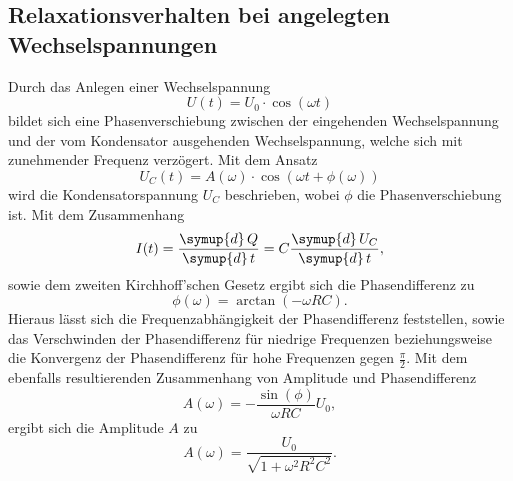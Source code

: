 \subsection{Relaxationsverhalten bei angelegten Wechselspannungen}
    Durch das Anlegen einer Wechselspannung 
    \begin{equation}
        \label{eqn:Wechselspannung}
        U(t) = U_0 \cdot \cos(\omega t)
    \end{equation}
    bildet sich eine Phasenverschiebung zwischen der eingehenden Wechselspannung und der vom Kondensator 
    ausgehenden Wechselspannung, welche sich mit zunehmender Frequenz verzögert. Mit dem Ansatz 
    \begin{equation}
        \label{eqn:Kondensatorspannung}
        U_C (t) = A(\omega) \cdot \cos(\omega t + \phi(\omega))
    \end{equation}
    wird die Kondensatorspannung $U_C$ beschrieben, wobei $\phi$ die Phasenverschiebung ist.
    Mit dem Zusammenhang
    \begin{equation}
        \label{eqn:stromstaerke}
        I(t) = \frac{\symup{d} \, Q} {\symup{d} \, t} = C \frac{\symup{d} \, U_C} {\symup{d} \, t},
    \end{equation}
    sowie dem zweiten Kirchhoff'schen Gesetz ergibt sich die Phasendifferenz zu 
    \begin{equation}
        \label{eqn:phasendifferenz}
        \phi(\omega) = \arctan (-\omega R C).
    \end{equation}
    Hieraus lässt sich die Frequenzabhängigkeit der Phasendifferenz feststellen, sowie das Verschwinden der Phasendifferenz für niedrige 
    Frequenzen beziehungsweise die Konvergenz der Phasendifferenz für hohe Frequenzen gegen $\frac{\pi}{2}$.
    Mit dem ebenfalls resultierenden Zusammenhang von Amplitude und Phasendifferenz
    \begin{equation}
        \label{eqn:zusammenhang}
        A(\omega) = - \frac {\sin(\phi)}{\omega R C} U_0,
    \end{equation}
    ergibt sich die Amplitude $A$ zu
    \begin{equation}
    \label{eqn:amplitude}
    A(\omega) = \frac{U_0}{\sqrt{1 + \omega^2 R^2 C^2}}.
    \end{equation}

